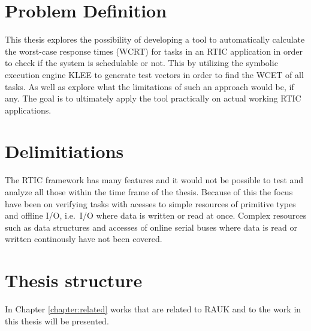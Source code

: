 
\section{Problem Definition}
This thesis explores the possibility of developing a tool to automatically
calculate the worst-case response times (WCRT)  for tasks in an RTIC
application in order to check if the system is schedulable or not. This by
utilizing the symbolic execution engine KLEE to generate test vectors in
order to find the WCET of all tasks. As well as explore what the limitations of
such an approach would be, if any. The goal is to ultimately apply the tool
practically on actual working RTIC applications.

\section{Delimitiations}
The RTIC framework has many features and it would not be possible to test and
analyze all those within the time frame of the thesis.  Because of this the
focus have been on verifying tasks with acesses to simple resources of
primitive types and offline I/O, i.e.\ I/O where data is written or read at
once. Complex resources such as data structures and accesses of online serial
buses where data is read or written continously have not been covered.

\section{Thesis structure}
In Chapter \ref{chapter:related} works that are related to RAUK and to the work in
this thesis will be presented.
